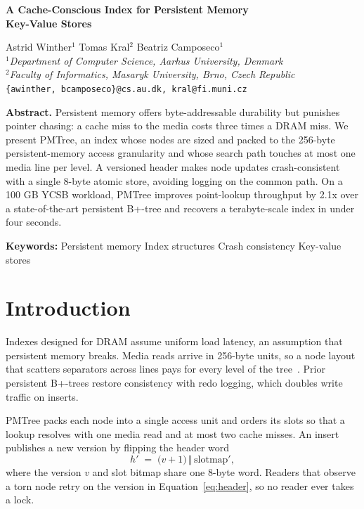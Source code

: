 \documentclass[10pt]{article}
\begin{document}
\begin{center}
  {\Large\bfseries A Cache-Conscious Index for Persistent Memory\\ Key-Value Stores\par}
  \vskip 12pt
  {Astrid Winther$^{1}$ \quad Tomas Kral$^{2}$ \quad Beatriz Camposeco$^{1}$}\\[6pt]
  {\small\itshape $^{1}$Department of Computer Science, Aarhus University, Denmark\\
   $^{2}$Faculty of Informatics, Masaryk University, Brno, Czech Republic}\\[3pt]
  {\small\texttt{\{awinther, bcamposeco\}@cs.au.dk, kral@fi.muni.cz}}
\end{center}

\vskip 14pt
\begin{center}
\begin{minipage}{0.88\textwidth}\small
\textbf{Abstract.} Persistent memory offers byte-addressable durability but
punishes pointer chasing: a cache miss to the media costs three times a DRAM
miss. We present PMTree, an index whose nodes are sized and packed to the
256-byte persistent-memory access granularity and whose search path touches
at most one media line per level. A versioned header makes node updates
crash-consistent with a single 8-byte atomic store, avoiding logging on the
common path. On a 100 GB YCSB workload, PMTree improves point-lookup
throughput by 2.1x over a state-of-the-art persistent B+-tree and recovers a
terabyte-scale index in under four seconds.

\medskip
\textbf{Keywords:} Persistent memory \; Index structures \; Crash consistency \; Key-value stores
\end{minipage}
\end{center}
\vskip 10pt

\section{Introduction}
Indexes designed for DRAM assume uniform load latency, an assumption that
persistent memory breaks. Media reads arrive in 256-byte units, so a node
layout that scatters separators across lines pays for every level of the
tree~\cite{eriksen2023pmlat}. Prior persistent B+-trees restore consistency
with redo logging, which doubles write traffic on inserts.

PMTree packs each node into a single access unit and orders its slots so
that a lookup resolves with one media read and at most two cache misses. An
insert publishes a new version by flipping the header word
\begin{equation}
  h' \;=\; \bigl(v + 1\bigr) \,\Vert\, \mathrm{slotmap}',
  \label{eq:header}
\end{equation}
where the version $v$ and slot bitmap share one 8-byte word. Readers that
observe a torn node retry on the version in Equation~\eqref{eq:header}, so
no reader ever takes a lock.
\end{document}
